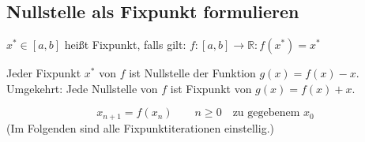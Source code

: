 \subsection{Nullstelle als Fixpunkt formulieren}

\begin{definition}
	$x^* \in [a, b]$ heißt Fixpunkt, falls gilt: $f: [a, b] \rightarrow \mathbb{R}: f(x^*) = x^*$
\end{definition}
\begin{lemma}
	Jeder Fixpunkt $x^*$ von $f$ ist Nullstelle der Funktion $g(x) = f(x) - x$. \\
	Umgekehrt: Jede Nullstelle von $f$ ist Fixpunkt von $g(x) = f(x) + x$.
\end{lemma}
\begin{definition}\flush
	\begin{equation*}
		x_{n + 1} = f(x_n) \qquad n \geq 0 \quad \text{zu gegebenem $x_0$}
	\end{equation*}
	(Im Folgenden sind alle Fixpunktiterationen einstellig.)
\end{definition}

